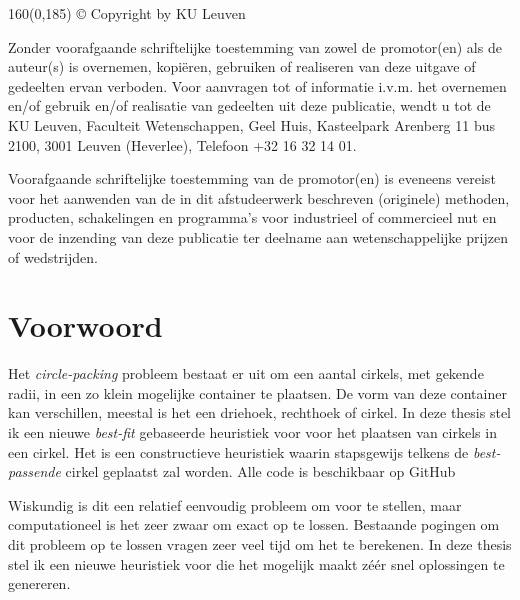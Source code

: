 \documentclass[12pt,a4paper,oneside]{book}
\begin{document}
\newpage
\thispagestyle{empty}
\begin{textblock}{160}(0,185)
© Copyright by KU Leuven

Zonder voorafgaande schriftelijke toestemming van zowel de promotor(en) als de auteur(s) is overnemen, kopiëren, gebruiken of realiseren van deze uitgave of gedeelten ervan verboden. Voor aanvragen tot of informatie i.v.m. het overnemen en/of gebruik en/of realisatie van gedeelten uit deze publicatie, wendt u tot de KU Leuven, Faculteit Wetenschappen, Geel Huis, Kasteelpark Arenberg 11 bus 2100, 3001 Leuven (Heverlee), Telefoon +32 16 32 14 01.

Voorafgaande schriftelijke toestemming van de promotor(en) is eveneens vereist voor het aanwenden van de in dit afstudeerwerk beschreven (originele) methoden, producten, schakelingen en programma’s voor industrieel of commercieel nut en voor de inzending van deze publicatie ter deelname aan wetenschappelijke prijzen of wedstrijden.
\end{textblock}

\newpage

\rmfamily
\setcounter{page}{0}

\newpage

\chapter*{Voorwoord}

Het \textit{circle-packing} probleem bestaat er uit om een aantal cirkels, met gekende radii, in een zo klein mogelijke container te plaatsen.
De vorm van deze container kan verschillen, meestal is het een driehoek, rechthoek of cirkel.
In deze thesis stel ik een nieuwe \textit{best-fit} gebaseerde heuristiek voor voor het plaatsen van cirkels in een cirkel.
Het is een constructieve heuristiek waarin stapsgewijs telkens de \textit{best-passende} cirkel geplaatst zal worden.
Alle code is beschikbaar op GitHub \cite{circle-packing-github}

Wiskundig is dit een relatief eenvoudig probleem om voor te stellen, maar computationeel is het zeer zwaar om exact op te lossen.
Bestaande pogingen om dit probleem op te lossen vragen zeer veel tijd om het te berekenen.
In deze thesis stel ik een nieuwe heuristiek voor die het mogelijk maakt zéér snel oplossingen te genereren.
\end{document}
